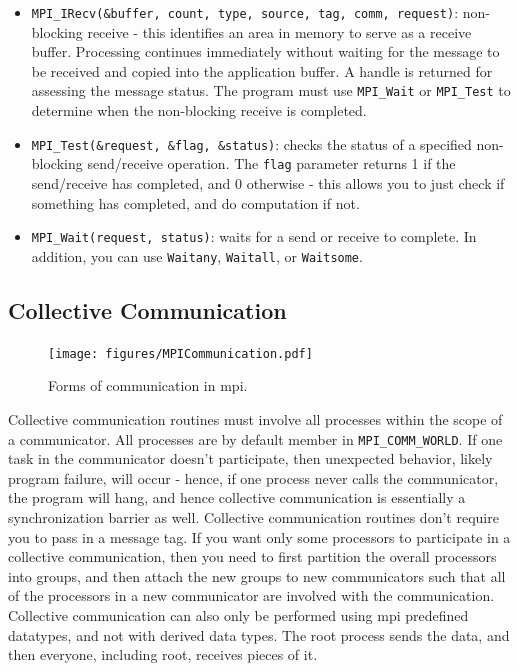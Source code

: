 \documentclass[10pt]{article}
\begin{document}
\begin{flushleft}
\begin{itemize}
\item {\tt MPI\_IRecv(\&buffer, count, type, source, tag, comm, request)}: non-blocking receive - this identifies an area in memory to serve as a receive buffer. Processing continues immediately without waiting for the message to be received and copied into the application buffer. A handle is returned for assessing the message status. The program must use {\tt MPI\_Wait} or {\tt MPI\_Test} to determine when the non-blocking receive is completed. 
\item {\tt MPI_Test(\&request, \&flag, \&status)}: checks the status of a specified non-blocking send/receive operation. The {\tt flag} parameter returns 1 if the send/receive has completed, and 0 otherwise - this allows you to just check if something has completed, and do computation if not.
\item {\tt MPI\_Wait(request, status)}: waits for a send or receive to complete. In addition, you can use {\tt Waitany}, {\tt Waitall}, or {\tt Waitsome}.
\end{itemize}

\subsection{Collective Communication}

\begin{figure}[H]
\centering
\texttt{[image: figures/MPICommunication.pdf]}
\caption{Forms of communication in \gls{mpi}.}
\end{figure}

Collective communication routines must involve all processes within the scope of a communicator. All processes are by default member in {\tt MPI\_COMM\_WORLD}. If one task in the communicator doesn't participate, then unexpected behavior, likely program failure, will occur - hence, if one process never calls the communicator, the program will hang, and hence collective communication is essentially a synchronization barrier as well. Collective communication routines don't require you to pass in a message tag. If you want only some processors to participate in a collective communication, then you need to first partition the overall processors into groups, and then attach the new groups to new communicators such that all of the processors in a new communicator are involved with the communication. Collective communication can also only be performed using \gls{mpi} predefined datatypes, and not with derived data types. The root process sends the data, and then everyone, including root, receives pieces of it.


\end{flushleft}
\end{document}
